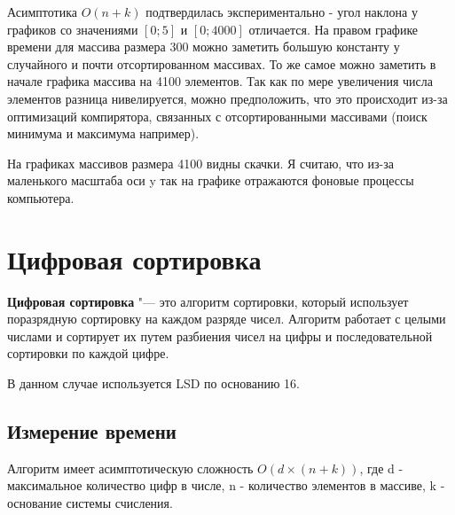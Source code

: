 \documentclass[11pt]{article}
\begin{document}
Асимптотика $O(n + k)$ подтвердилась экспериментально - угол наклона у графиков со значениями
$\left[0;5\right]$ и $\left[0;4000\right]$ отличается. На правом графике времени для массива размера 300
можно заметить большую константу у случайного и почти отсортированном массивах. То же самое можно заметить в
начале графика массива на 4100 элементов. Так как по мере увеличения числа элементов разница нивелируется, можно предположить, что
это происходит из-за оптимизаций компирятора, связанных с отсортированными массивами (поиск минимума и максимума например).

На графиках массивов размера 4100 видны скачки. Я считаю, что из-за маленького масштаба оси y так на графике отражаются фоновые процессы
компьютера.

\newpage

\setcounter{section}{8}
\section*{\centering Цифровая сортировка}

\textbf{Цифровая сортировка} "--- это алгоритм сортировки, который использует поразрядную сортировку на каждом разряде чисел. Алгоритм работает
с целыми числами и сортирует их путем разбиения чисел на цифры и последовательной сортировки по каждой цифре.

В данном случае используется LSD по основанию 16.

\setcounter{subsection}{0}
\subsection{Измерение времени}

\begin{center}
\end{center}
{ \hspace*{\fill} }

\begin{center}
\end{center}
{ \hspace*{\fill} }

Алгоритм имеет асимптотическую сложность $O(d \times (n + k))$, где d - максимальное количество цифр
в числе, n - количество элементов в массиве, k - основание системы счисления.
\end{document}
